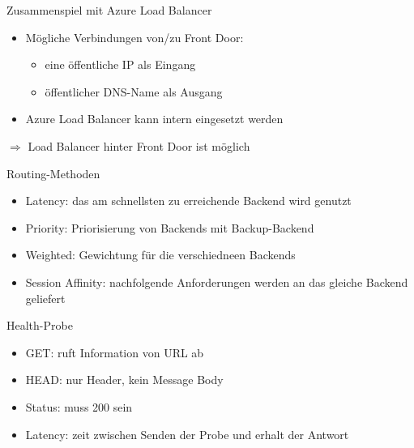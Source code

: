 \begin{flashcard}[Definition]{Zusammenspiel mit Azure Load Balancer}
    \begin{itemize}
        \item Mögliche Verbindungen von/zu Front Door:
            \begin{itemize}
                \item eine öffentliche IP als Eingang
                \item öffentlicher DNS-Name als Ausgang
            \end{itemize}
        \item Azure Load Balancer kann intern eingesetzt werden
    \end{itemize}
    $\Rightarrow$ Load Balancer hinter Front Door ist möglich
\end{flashcard}

\begin{flashcard}[Definition]{Routing-Methoden}
    \begin{itemize}
        \item Latency: das am schnellsten zu erreichende Backend wird genutzt
        \item Priority: Priorisierung von Backends mit Backup-Backend
        \item Weighted: Gewichtung für die verschiedneen Backends
        \item Session Affinity: nachfolgende Anforderungen werden an das gleiche Backend geliefert
    \end{itemize}
\end{flashcard}

\begin{flashcard}[Definition]{Health-Probe}
    \begin{itemize}
        \item GET: ruft Information von URL ab
        \item HEAD: nur Header, kein Message Body
        \item Status: muss 200 sein
        \item Latency: zeit zwischen Senden der Probe und erhalt der Antwort
    \end{itemize}
\end{flashcard}

